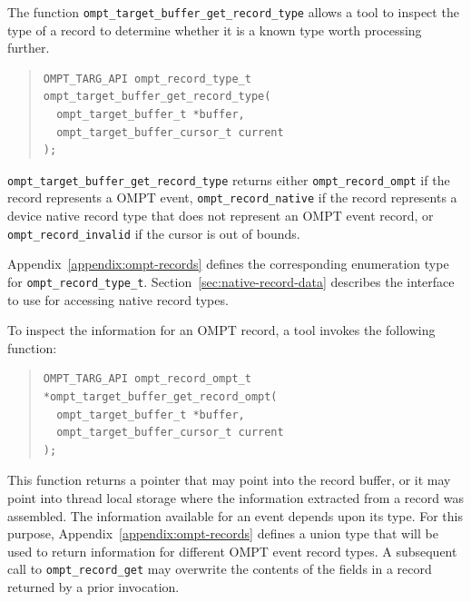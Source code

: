 \documentclass{article}
\begin{document}
The function \verb|ompt_target_buffer_get_record_type| allows a tool to inspect the type of a record to determine whether it is a known type  worth processing further. 
\begin{quote}
\begin{verbatim}
OMPT_TARG_API ompt_record_type_t ompt_target_buffer_get_record_type(
  ompt_target_buffer_t *buffer, 
  ompt_target_buffer_cursor_t current
);
\end{verbatim}
\end{quote}
\sloppy
\verb|ompt_target_buffer_get_record_type| returns either \verb|ompt_record_ompt| if the record represents a OMPT event,  
\verb|ompt_record_native| if the record represents a device native record type that does not represent an OMPT event record, or \verb|ompt_record_invalid| if the cursor is out of bounds. 

Appendix~\ref{appendix:ompt-records} defines the corresponding enumeration type for \verb|ompt_record_type_t|. 
Section~\ref{sec:native-record-data} describes the interface to use for accessing native record types.
 

To inspect the information for an OMPT record, a tool invokes the following function:
\begin{quote}
\begin{verbatim}
OMPT_TARG_API ompt_record_ompt_t *ompt_target_buffer_get_record_ompt(
  ompt_target_buffer_t *buffer, 
  ompt_target_buffer_cursor_t current
);
\end{verbatim}
\end{quote}
This function returns a pointer that may point into the record buffer, or it may point into thread local storage where the information extracted from a record was assembled. The information available for an event depends upon its type. For this purpose, Appendix~\ref{appendix:ompt-records} defines a union type that will be used to return information for different OMPT event record types. A subsequent call to \verb|ompt_record_get| may overwrite the contents of the fields in a record returned by a prior invocation.
\end{document}
